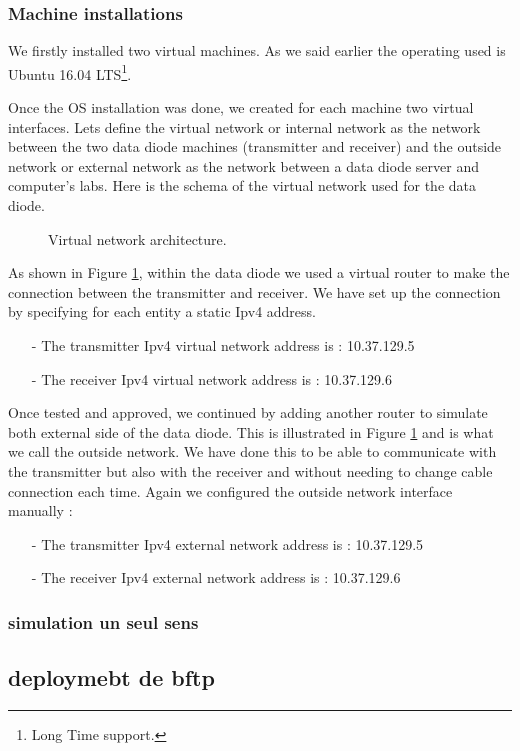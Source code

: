 \documentclass[a4paper,10pt]{article}
\begin{document}
\subsubsection{Machine installations}
We firstly installed two virtual machines. As we said earlier the operating used is Ubuntu 16.04 LTS\footnote{Long Time support.}. 

Once the OS installation was done, we created for each machine two virtual interfaces. Lets define the virtual network or internal network as the network between the two data diode machines (transmitter and receiver) and the outside network or external network as the network between a data diode server and computer's labs. Here is the schema of the virtual network used for the data diode. 

\begin{figure}[!h]
\caption{Virtual network architecture.}
\label{fig:netvirt}
\end{figure}

As shown in Figure \ref{fig:netvirt}, within the data diode we used a virtual router to make the connection between the transmitter and receiver. We have set up the connection by specifying for each entity a static Ipv4 address. 
\begin{enumerate}
\item[-] The transmitter Ipv4 virtual network address is : 10.37.129.5
\item[-] The receiver Ipv4 virtual network address is : 10.37.129.6
\end{enumerate}

Once tested and approved, we continued by adding another router to simulate both external side of the data diode. This is illustrated in Figure \ref{fig:netvirt} and is what we call the outside network. We have done this to be able to communicate with the transmitter but also with the receiver and without needing to change cable connection each time. Again we configured the outside network interface manually :
\begin{enumerate}
\item[-] The transmitter Ipv4 external network address is : 10.37.129.5
\item[-] The receiver Ipv4 external network address is : 10.37.129.6
\end{enumerate}
\subsubsection{simulation un seul sens}
\subsection{deploymebt de bftp}
\end{document}
